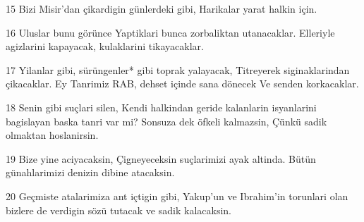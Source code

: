 \par 15 Bizi Misir'dan çikardigin günlerdeki gibi, Harikalar yarat halkin için.
\par 16 Uluslar bunu görünce Yaptiklari bunca zorbaliktan utanacaklar. Elleriyle agizlarini kapayacak, kulaklarini tikayacaklar.
\par 17 Yilanlar gibi, sürüngenler* gibi toprak yalayacak, Titreyerek siginaklarindan çikacaklar. Ey Tanrimiz RAB, dehset içinde sana dönecek Ve senden korkacaklar.
\par 18 Senin gibi suçlari silen, Kendi halkindan geride kalanlarin isyanlarini bagislayan baska tanri var mi? Sonsuza dek öfkeli kalmazsin, Çünkü sadik olmaktan hoslanirsin.
\par 19 Bize yine aciyacaksin, Çigneyeceksin suçlarimizi ayak altinda. Bütün günahlarimizi denizin dibine atacaksin.
\par 20 Geçmiste atalarimiza ant içtigin gibi, Yakup'un ve Ibrahim'in torunlari olan bizlere de verdigin sözü tutacak ve sadik kalacaksin.


